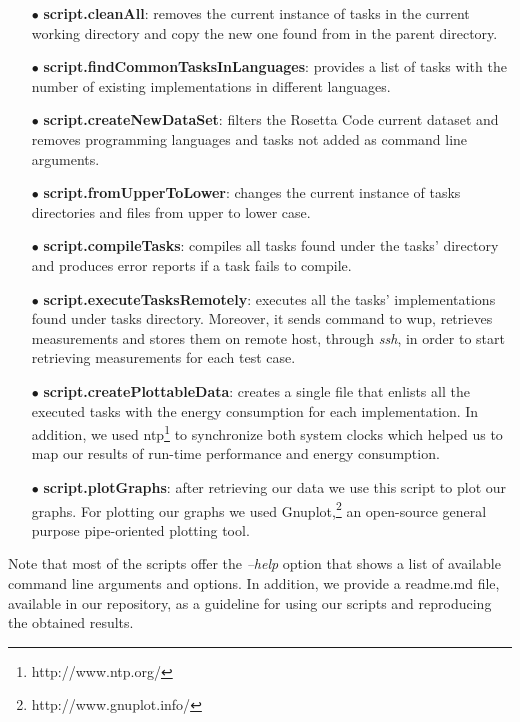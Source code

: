 \begin{enumerate}
	\item [$\bullet$] \textbf{script.cleanAll}: removes the current instance 
	of tasks in the current working directory and copy the new one found 
	from in the parent directory. 
	\item [$\bullet$] \textbf{script.findCommonTasksInLanguages}: provides 
	a list of tasks with the number of existing implementations in different languages.
	\item [$\bullet$] \textbf{script.createNewDataSet}: filters the Rosetta 
	Code current dataset and removes programming languages and tasks not 
	added as command line arguments.
	\item [$\bullet$] \textbf{script.fromUpperToLower}: changes the current 
	instance of tasks directories and files from upper to lower 
	case. 
	\item [$\bullet$] \textbf{script.compileTasks}: compiles all tasks found 
	under the tasks' directory and produces error reports if a task fails to 
	compile.
	\item [$\bullet$] \textbf{script.executeTasksRemotely}: executes all the tasks' 
	implementations found under tasks directory. 
	Moreover, it sends command to {\sc wup}, retrieves measurements and stores 
	them on remote host, through \textit{ssh}, in order to start retrieving 
	measurements for each test case. 
	\item [$\bullet$] \textbf{script.createPlottableData}: creates a single file 
	that enlists all the executed tasks with the energy consumption for each 
	implementation. In addition, we used {\sc ntp}\footnote{http://www.ntp.org/} to 
	synchronize both system clocks which helped us to map our results of 
	run-time performance and energy consumption. 
	\item [$\bullet$] \textbf{script.plotGraphs}: after retrieving our data 
	we use this script to plot our graphs. 
	For plotting our graphs we used Gnuplot,\footnote{http://www.gnuplot.info/} 
	an open-source general purpose pipe-oriented plotting tool.
\end{enumerate}

Note that most of the scripts offer the \textit{--help} option 
that shows a list of available command line arguments and options.
In addition, we provide a {\sc readme.md} file, available in our 
repository, as a guideline for using our scripts and reproducing 
the obtained results.  

